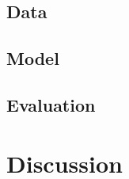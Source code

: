 \documentclass[journal]{IEEEtran}
\begin{document}
\subsection{Data}
\subsection{Model}
\subsection{Evaluation}


\section{Discussion}
\end{document}
